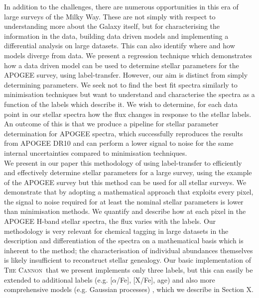 \documentclass[12pt, preprint]{aastex}
\newcommand{\tc}{\textsc{The Cannon}}
\begin{document}
In addition to the challenges, there are numerous opportunities in this era of large surveys of the Milky Way. These are not simply with respect to understanding more about the Galaxy itself, but for characterising the information in the data, building data driven models and implementing a differential analysis on large datasets. This can also identify where and how models diverge from data. We present a regression technique which demonstrates how a data driven model can be used to determine stellar parameters for the APOGEE survey, using label-transfer. However, our aim is distinct from simply determining parameters. We seek not to find the best fit spectra similarly to minimisation techniques but want to understand and characterise the spectra as a function of the labels which describe it.  We wish to determine, for each data point in our stellar spectra how the flux changes in response to the stellar labels. An outcome of this is that we produce a pipeline for stellar parameter determination for APOGEE spectra, which successfully reproduces the results from APOGEE DR10 and can perform a lower signal to noise for the same internal uncertainties compared to minimisation techniques. \\

We present in our paper this methodology of using label-transfer to efficiently and effectively determine stellar parameters for a large survey, using the example of the APOGEE survey but this method can be used for all stellar surveys. We demonstrate that by adopting a mathematical approach that exploits every pixel, the signal to noise required for at least the nominal stellar parameters is lower than minimisation methods. We quantify and describe how at each pixel in the APOGEE H-band stellar spectra, the flux varies with the labels. Our methodology is very relevant for chemical tagging in large datasets in the description and differentiation of the spectra on a mathematical basis which is inherent to the method; the characterisation of individual abundances themselves is likely insufficient to reconstruct stellar genealogy.  Our basic implementation of \tc\ that we present implements only three labels, but this can easily be extended to additional labels  (e.g. [$\alpha$/Fe], [X/Fe], age) and also more comprehensive models (e.g. Gaussian processes) , which we describe in Section X. %
\end{document}
